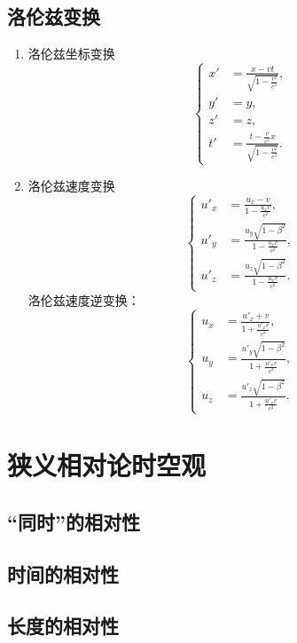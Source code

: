     \subsection{洛伦兹变换}
    \begin{enumerate}
        \item 洛伦兹坐标变换
        \[
        \left\{
        \begin{aligned}
        x' &= \frac{x - vt}{\sqrt{1 - \frac{v^2}{c^2}}}, \\
        y' &= y, \\
        z' &= z, \\
        t' &= \frac{t - \frac{v}{c^2} x}{\sqrt{1 - \frac{v^2}{c^2}}}.
        \end{aligned}
        \right.
        \]
        \item 洛伦兹速度变换
        \[
        \left\{
        \begin{aligned}
        u'_x &= \frac{u_x - v}{1 - \frac{u_x v}{c^2}}, \\
        u'_y &= \frac{u_y \sqrt{1 - \beta^2}}{1 - \frac{u_x v}{c^2}}, \\
        u'_z &= \frac{u_z \sqrt{1 - \beta^2}}{1 - \frac{u_x v}{c^2}}.
        \end{aligned}
        \right.
        \]
        洛伦兹速度逆变换：
        \[
        \left\{
        \begin{aligned}
        u_x &= \frac{u'_x + v}{1 + \frac{u'_x v}{c^2}}, \\
        u_y &= \frac{u'_y \sqrt{1 - \beta^2}}{1 + \frac{u'_x v}{c^2}}, \\
        u_z &= \frac{u'_z \sqrt{1 - \beta^2}}{1 + \frac{u'_x v}{c^2}}.
        \end{aligned}
        \right.
        \]
    \end{enumerate}

\section{狭义相对论时空观}
    \subsection{“同时”的相对性}
    \subsection{时间的相对性}
    \subsection{长度的相对性}

